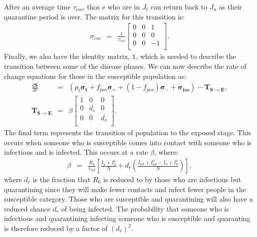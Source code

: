 \documentclass[notitlepage, superscriptaddress]{revtex4-2}
\begin{document}
After an average time $\tau_{iso}$, thos e who are in $J_{t}$ can return back to $J_{u}$ as their quarantine period is over. The matrix for this transition is:
\begin{eqnarray} 
\sigma_{iso} &=& \frac{1}{\tau_{iso}}
    \begin{bmatrix}
    0 & 0 & 1 \\ 
    0 & 0 & 0 \\
    0 & 0 & -1 \\
    \end{bmatrix}.
\end{eqnarray}
Finally, we also have the identity matrix, $\mathbb{1}$, which is needed to describe the transition between some of the disease phases. We can now describe the rate of change equations for those in the susceptible population as:
\begin{eqnarray} 
\frac{d \boldsymbol{S}}{dt} &=& \left( p_{t} \boldsymbol{\sigma_{t}} + f_{pos} \boldsymbol{\sigma_{+}} + (1-f_{pos}) \boldsymbol{\sigma_{-}} + \boldsymbol{\sigma_{iso}} \right) - \boldsymbol{T_{S \rightarrow E}}, \\
%
\boldsymbol{T_{S \rightarrow E}} &=& \beta
    \begin{bmatrix}
    1 & 0 & 0 \\ 
    0 & d_{r} & 0 \\
    0 & 0 & d_{r} \\
    \end{bmatrix}.
\end{eqnarray}
The final term represents the transition of population to the exposed stage. This occurs when someone who is susceptible comes into contact with someone who is infectious and is infected. This occurs at a rate $\beta$, where:
\begin{eqnarray}
\beta &=& \frac{R_{0}}{\tau_{inf}} \left[ \frac{I_{u} + I^{a}_{u}}{N} + d_{r} \left( \frac{I_{tot} + I^{a}_{tot} -I_{u} + I^{a}_{u}}{N} \right) \right],
\end{eqnarray}
where $d_{r}$ is the fraction that $R_{0}$ is reduced to by those who are infectious but quarantining since they will make fewer contacts and infect fewer people in the susceptible category. Those who are susceptible and quarantining will also have a reduced chance $d_{r}$ of being infected. The probability that someone who is infectious and quarantining infecting someone who is susceptible and quaranting is therefore reduced by a factor of $(d_{r})^{2}$.
\end{document}
